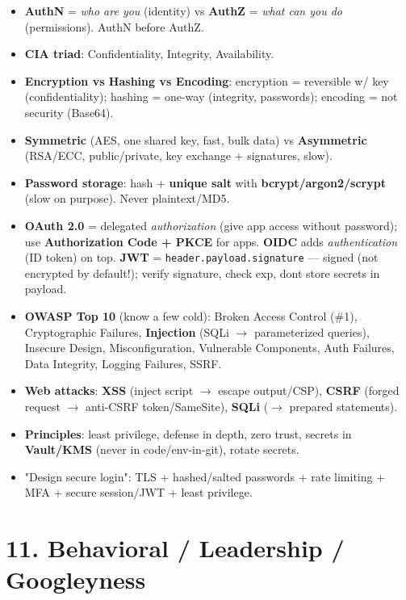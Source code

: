 \documentclass[11pt]{article}
\providecommand{\tightlist}{\setlength{\itemsep}{1pt}\setlength{\parskip}{0pt}}
\begin{document}
\begin{itemize}
\tightlist
\item
  \textbf{AuthN} = \emph{who are you} (identity) vs \textbf{AuthZ} = \emph{what can you do} (permissions). AuthN before AuthZ.
\item
  \textbf{CIA triad}: Confidentiality, Integrity, Availability.
\item
  \textbf{Encryption vs Hashing vs Encoding}: encryption = reversible w/ key (confidentiality); hashing = one-way (integrity, passwords); encoding = not security (Base64).
\item
  \textbf{Symmetric} (AES, one shared key, fast, bulk data) vs \textbf{Asymmetric} (RSA/ECC, public/private, key exchange + signatures, slow).
\item
  \textbf{Password storage}: hash + \textbf{unique salt} with \textbf{bcrypt/argon2/scrypt} (slow on purpose). Never plaintext/MD5.
\item
  \textbf{OAuth 2.0} = delegated \emph{authorization} (give app access without password); use \textbf{Authorization Code + PKCE} for apps. \textbf{OIDC} adds \emph{authentication} (ID token) on top. \textbf{JWT} = \texttt{header.payload.signature} --- signed (not encrypted by default!); verify signature, check exp, don\textquotesingle t store secrets in payload.
\item
  \textbf{OWASP Top 10} (know a few cold): Broken Access Control (\#1), Cryptographic Failures, \textbf{Injection} (SQLi \(\rightarrow\) parameterized queries), Insecure Design, Misconfiguration, Vulnerable Components, Auth Failures, Data Integrity, Logging Failures, SSRF.
\item
  \textbf{Web attacks}: \textbf{XSS} (inject script \(\rightarrow\) escape output/CSP), \textbf{CSRF} (forged request \(\rightarrow\) anti-CSRF token/SameSite), \textbf{SQLi} (\(\rightarrow\) prepared statements).
\item
  \textbf{Principles}: least privilege, defense in depth, zero trust, secrets in \textbf{Vault/KMS} (never in code/env-in-git), rotate secrets.
\item
  "Design secure login": TLS + hashed/salted passwords + rate limiting + MFA + secure session/JWT + least privilege.
\end{itemize}

\section{11. Behavioral / Leadership / Googleyness}\label{11-behavioral--leadership--googleyness}
\end{document}
